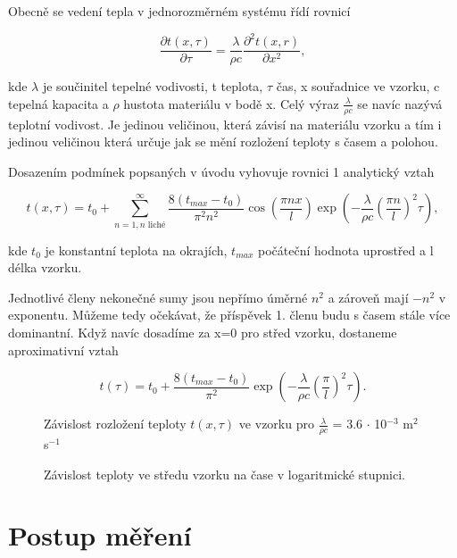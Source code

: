 \documentclass[a4paper,11pt]{article}
\begin{document}
Obecně se vedení tepla v jednorozměrném systému řídí rovnicí

\begin{equation}
\frac{\partial t(x, \tau)}{\partial \tau} = \frac{\lambda}{\rho c} \frac{\partial^2 t(x,r)}{\partial x^2},
\end{equation}

\noindent
kde $\lambda$ je součinitel tepelné vodivosti, t teplota,  $\tau$ čas, x souřadnice ve vzorku, c tepelná kapacita a $\rho$ hustota materiálu v bodě x. Celý výraz $\frac{\lambda}{\rho c}$ se navíc nazývá teplotní vodivost. Je jedinou veličinou, která závisí na materiálu vzorku a tím i jedinou veličinou která určuje jak se mění rozložení teploty s časem a polohou. 

Dosazením podmínek popsaných v úvodu vyhovuje rovnici 1 analytický vztah

\begin{equation}
  t(x, \tau) = t_0 + \sum_{n=1, n \text{ liché}}^{\infty} \frac{8(t_{max} - t_0)}{\pi^2 n^2}\cos(\frac{\pi n x}{l})\exp(- \frac{\lambda}{\rho c} (\frac{\pi n}{l})^2 \tau), 
\end{equation}

\noindent
kde $t_0$ je konstantní teplota na okrajích, $t_{max}$ počáteční hodnota uprostřed a l délka vzorku.

Jednotlivé členy nekonečné sumy jsou nepřímo úměrné $n^2$ a zároveň mají $-n^2$ v exponentu. Můžeme tedy očekávat, že příspěvek 1. členu budu s časem stále více dominantní. Když navíc dosadíme za x=0 pro střed vzorku, dostaneme aproximativní vztah

\begin{equation}
  t(\tau) = t_0 + \frac{8(t_{max} - t_0)}{\pi^2}\exp(- \frac{\lambda}{\rho c} (\frac{\pi}{l})^2 \tau).
\end{equation}

\begin{figure}[htpb]
  \centering
  
  \caption{Závislost rozložení teploty $t(x, \tau)$ ve vzorku pro $\frac{\lambda}{\rho c}$ = 3.6 $\cdot$ 10$^{-3}$ m$^2$ s$^{-1}$}
\end{figure}


\begin{figure}[htpb]
  \centering
  
  \caption{Závislost teploty ve středu vzorku na čase v logaritmické stupnici.}
\end{figure}

\section{Postup měření}
\end{document}
